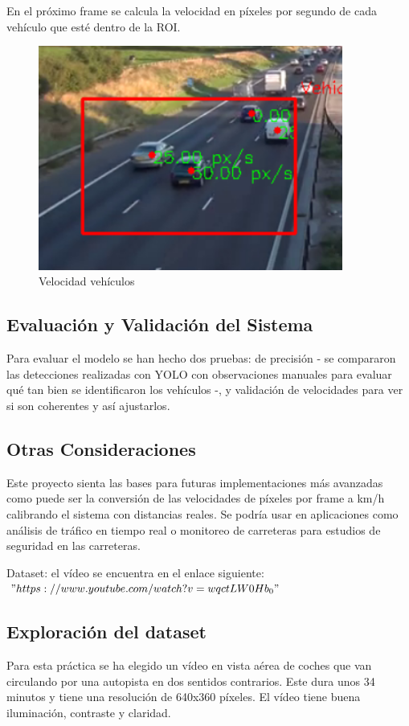 En el próximo frame se calcula la velocidad en píxeles por segundo de cada vehículo que esté dentro de la ROI.
\begin{figure}[h!]
    \centering
    \includegraphics[width = 10cm]{ImagenesLatex/im4.png}{}
    \caption{Velocidad vehículos}
    \label{fig:enter-label}
\end{figure}

\subsection{Evaluación y Validación del Sistema}
Para evaluar el modelo se han hecho dos pruebas: de precisión - se compararon las detecciones realizadas con YOLO con observaciones manuales para evaluar qué tan bien se identificaron los vehículos -, y validación de velocidades para ver si son coherentes y así ajustarlos.

\subsection{Otras Consideraciones}
Este proyecto sienta las bases para futuras implementaciones más avanzadas como puede ser la conversión de las velocidades de píxeles por frame a km/h calibrando el sistema con distancias reales. Se podría usar en aplicaciones como análisis de tráfico en tiempo real o monitoreo de carreteras para estudios de seguridad en las carreteras.


Dataset: el vídeo se encuentra en el enlace siguiente:
$"https://www.youtube.com/watch?v=wqctLW0Hb_0"$



\subsection{Exploración del dataset}
Para esta práctica se ha elegido un vídeo en vista aérea de coches que van circulando por una autopista en dos sentidos contrarios.  Este dura unos 34 minutos y tiene una resolución de 640x360 píxeles.
El vídeo tiene buena iluminación, contraste y claridad.


